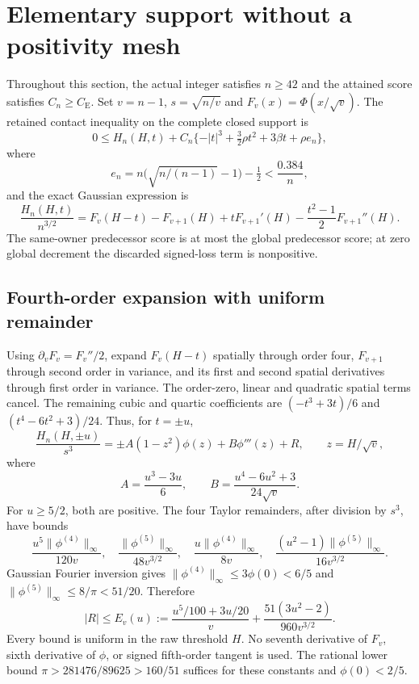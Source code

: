 \documentclass[11pt]{article}
\newcommand{\CE}{C_{\mathrm E}}
\begin{document}
\section{Elementary support without a positivity mesh}
Throughout this section, the actual integer satisfies $n\ge42$ and the
attained score satisfies $C_n\ge\CE$.
Set $v=n-1$, $s=\sqrt{n/v}$ and $F_v(x)=\Phi(x/\sqrt v)$. The retained
contact inequality on the complete closed support is
\begin{equation}\label{contact}
 0\le H_n(H,t)+C_n\{-|t|^3+\tfrac32\rho t^2+3\beta t+\rho e_n\},
\end{equation}
where
\[
 e_n=n\bigl(\sqrt{n/(n-1)}-1\bigr)-\tfrac12<\frac{0.384}{n},
\]
and the exact Gaussian expression is
\[
 \frac{H_n(H,t)}{n^{3/2}}
 =F_v(H-t)-F_{v+1}(H)+tF_{v+1}'(H)
       -\frac{t^2-1}{2}F_{v+1}''(H).
\]
The same-owner predecessor score is at most the global predecessor score;
at zero global decrement the discarded signed-loss term is nonpositive.

\subsection{Fourth-order expansion with uniform remainder}
Using $\partial_vF_v=F_v''/2$, expand $F_v(H-t)$ spatially through order
four, $F_{v+1}$ through second order in variance, and its first and second
spatial derivatives through first order in variance. The order-zero, linear
and quadratic spatial terms cancel. The remaining cubic and quartic
coefficients are $(-t^3+3t)/6$ and $(t^4-6t^2+3)/24$. Thus, for $t=\pm u$,
\begin{equation}\label{expansion}
 \frac{H_n(H,\pm u)}{s^3}
  =\pm A(1-z^2)\phi(z)+B\phi'''(z)+R,\qquad z=H/\sqrt v,
\end{equation}
where
\[
 A=\frac{u^3-3u}{6},\qquad B=\frac{u^4-6u^2+3}{24\sqrt v}.
\]
For $u\ge5/2$, both are positive. The four Taylor remainders, after division
by $s^3$, have bounds
\[
 \frac{u^5\|\phi^{(4)}\|_\infty}{120v},\quad
 \frac{\|\phi^{(5)}\|_\infty}{48v^{3/2}},\quad
 \frac{u\|\phi^{(4)}\|_\infty}{8v},\quad
 \frac{(u^2-1)\|\phi^{(5)}\|_\infty}{16v^{3/2}}.
\]
Gaussian Fourier inversion gives
$\|\phi^{(4)}\|_\infty\le3\phi(0)<6/5$ and
$\|\phi^{(5)}\|_\infty\le8/\pi<51/20$. Therefore
\begin{equation}\label{error}
 |R|\le E_v(u):=\frac{u^5/100+3u/20}{v}
       +\frac{51(3u^2-2)}{960v^{3/2}}.
\end{equation}
Every bound is uniform in the raw threshold $H$. No seventh derivative
of $F_v$, sixth derivative of $\phi$, or signed fifth-order tangent is used.
The rational lower bound $\pi>281476/89625>160/51$ suffices for these
constants and $\phi(0)<2/5$.
\end{document}
